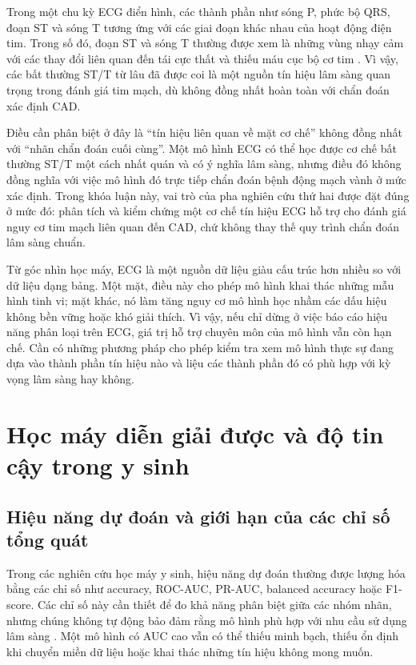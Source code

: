 \blocksep

Trong một chu kỳ ECG điển hình, các thành phần như sóng P, phức bộ QRS, đoạn ST và sóng T tương ứng với các giai đoạn khác nhau của hoạt động điện tim. Trong số đó, đoạn ST và sóng T thường được xem là những vùng nhạy cảm với các thay đổi liên quan đến tái cực thất và thiếu máu cục bộ cơ tim \cite{Clifford2006}. Vì vậy, các bất thường ST/T từ lâu đã được coi là một nguồn tín hiệu lâm sàng quan trọng trong đánh giá tim mạch, dù không đồng nhất hoàn toàn với chẩn đoán xác định CAD.

\blocksep

Điều cần phân biệt ở đây là “tín hiệu liên quan về mặt cơ chế” không đồng nhất với “nhãn chẩn đoán cuối cùng”. Một mô hình ECG có thể học được cơ chế bất thường ST/T một cách nhất quán và có ý nghĩa lâm sàng, nhưng điều đó không đồng nghĩa với việc mô hình đó trực tiếp chẩn đoán bệnh động mạch vành ở mức xác định. Trong khóa luận này, vai trò của pha nghiên cứu thứ hai được đặt đúng ở mức đó: phân tích và kiểm chứng một cơ chế tín hiệu ECG hỗ trợ cho đánh giá nguy cơ tim mạch liên quan đến CAD, chứ không thay thế quy trình chẩn đoán lâm sàng chuẩn.

\blocksep

Từ góc nhìn học máy, ECG là một nguồn dữ liệu giàu cấu trúc hơn nhiều so với dữ liệu dạng bảng. Một mặt, điều này cho phép mô hình khai thác những mẫu hình tinh vi; mặt khác, nó làm tăng nguy cơ mô hình học nhầm các dấu hiệu không bền vững hoặc khó giải thích. Vì vậy, nếu chỉ dừng ở việc báo cáo hiệu năng phân loại trên ECG, giá trị hỗ trợ chuyên môn của mô hình vẫn còn hạn chế. Cần có những phương pháp cho phép kiểm tra xem mô hình thực sự đang dựa vào thành phần tín hiệu nào và liệu các thành phần đó có phù hợp với kỳ vọng lâm sàng hay không.

\blocksep

\section{Học máy diễn giải được và độ tin cậy trong y sinh}

\blocksep

\subsection{Hiệu năng dự đoán và giới hạn của các chỉ số tổng quát}

\blocksep

Trong các nghiên cứu học máy y sinh, hiệu năng dự đoán thường được lượng hóa bằng các chỉ số như accuracy, ROC-AUC, PR-AUC, balanced accuracy hoặc F1-score. Các chỉ số này cần thiết để đo khả năng phân biệt giữa các nhóm nhãn, nhưng chúng không tự động bảo đảm rằng mô hình phù hợp với nhu cầu sử dụng lâm sàng \cite{Topol2019}. Một mô hình có AUC cao vẫn có thể thiếu minh bạch, thiếu ổn định khi chuyển miền dữ liệu hoặc khai thác những tín hiệu không mong muốn.

